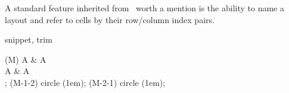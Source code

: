 A standard feature inherited from \TikZ\ worth a mention
is the ability to name a layout and refer to cells
by their row/column index pairs.

\begin{tcblisting}{snippet, trim}
\begin{kodi}[square=3em]
\obj (M) { A & A \\ A & A \\ };
\draw [red]   (M-1-2) circle (1em);
\draw [green] (M-2-1) circle (1em);
\end{kodi}
\end{tcblisting}
